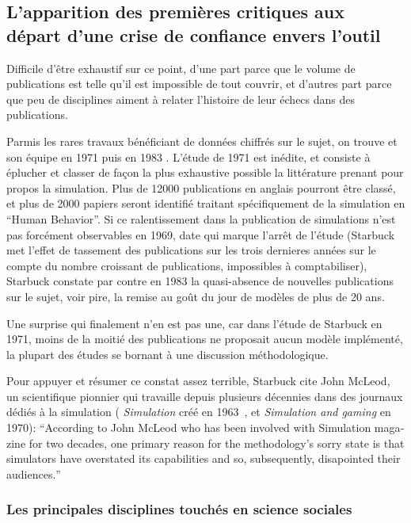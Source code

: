 {%

\subsection{L'apparition des premières critiques aux départ d'une crise de confiance envers l'outil }

Difficile d'être exhaustif sur ce point, d'une part parce que le volume de publications est telle qu'il est impossible de tout couvrir, et d'autres part parce que peu de disciplines aiment à relater l'histoire de leur échecs dans des publications.

Parmis les rares travaux bénéficiant de données chiffrés sur le sujet, on trouve \textcite{Dutton1971} et son équipe en 1971  puis \textcite{Starbuck1983} en 1983 . L'étude de 1971 est inédite, et consiste à éplucher et classer de façon la plus exhaustive possible la littérature prenant pour propos la simulation. Plus de 12000 publications en anglais pourront être classé, et plus de 2000 papiers seront identifié traitant spécifiquement de la simulation en \foreignquote{english}{Human Behavior}. Si ce ralentissement dans la publication de simulations n'est pas forcément observables en 1969, date qui marque l'arrêt de l'étude (Starbuck met l'effet de tassement des publications sur les trois dernieres années sur le compte du nombre croissant de publications, impossibles à comptabiliser), Starbuck constate par contre en 1983 la quasi-absence de nouvelles publications sur le sujet, voir pire, la remise au goût du jour de modèles de plus de 20 ans.

Une surprise qui finalement n'en est pas une, car dans l'étude de Starbuck en 1971, moins de la moitié des publications ne proposait aucun modèle implémenté, la plupart des études se bornant à une discussion méthodologique.

Pour appuyer et résumer ce constat assez terrible, Starbuck cite John McLeod, un scientifique pionnier qui travaille depuis plusieurs décennies dans des journaux dédiés à la simulation ( \textit{Simulation} créé en 1963 , et \textit{Simulation and gaming} en 1970): \foreignquote{english}{According to  John McLeod who has been involved with Simulation magazine for two decades, one primary reason for the methodology's sorry state is that simulators have overstated its capabilities and so, subsequently, disapointed their audiences.}

\subsubsection{Les principales disciplines touchés en science sociales}

}
